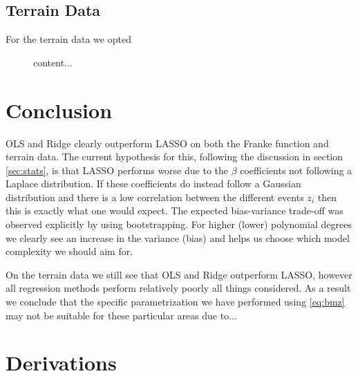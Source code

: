 \documentclass[%
reprint,
amsmath,amssymb,
aps,
pra,
]{revtex4-2}
\begin{document}
\subsection{Terrain Data}
For the terrain data we opted 

\begin{figure}
	content...
\end{figure}

\section{Conclusion}
OLS and Ridge clearly outperform LASSO on both the Franke function and terrain data. The current hypothesis for this, following the discussion in section \ref{sec:stats}, is that LASSO performs worse due to the $\beta$ coefficients not following a Laplace distribution. If these coefficients do instead follow a Gaussian distribution and there is a low correlation between the different events $z_i$ then this is exactly what one would expect. The expected bias-variance trade-off was observed explicitly by using bootstrapping. For higher (lower) polynomial degrees we clearly see an increase in the variance (bias) and helps us choose which model complexity we should aim for. 

On the terrain data we still see that OLS and Ridge outperform LASSO, however all regression methods perform relatively poorly all things considered. As a result we conclude that the specific parametrization we have performed using \eqref{eq:bmz} may not be suitable for these particular areas due to...






\appendix
\section{Derivations}
\label{Appendix:Derivations}
\end{document}
